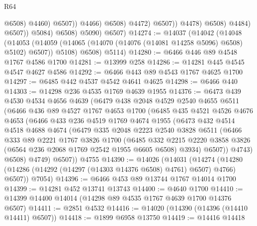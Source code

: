 \begin{lexlean}{R64}
\begin{coremodule}
                                        @6508)
                                      @4460)
                                    @6507))
                                @4466)
                              @6508)
                            @4472)
                          @6507))
                      @4478)
                    @6508)
                  @4484)
                @6507))
            @5084)
          @6508)
        @5090)
      @6507)
@14274 := @14037
    (@14042
      (@14048
        (@14053 (@14059 (@14065 (@14070 (@14076 (@14081 @14258 @5096) @6508) @5102) @6507)) @5108)
        @6508)
      @5114)
@14280 := @6466 @446 @89 @4548 @1767 @4586 @1700
@14281 := @13999 @258
@14286 := @14281 @445 @4545 @4547 @4627 @4586
@14292 := @6466 @443 @89 @4543 @1767 @4625 @1700
@14297 := @6485 @442 @4537 @4542 @4641 @4625
@14298 := @6466 @440
@14303 := @14298 @236 @4535 @1769 @4639 @1955
@14376 := @6473
    @439
    @4530
    @4534
    @4656
    @4639
    (@6479
      @438
      @2048
      @4529
      @2540
      @4655
      @6511
      (@6466
        @436
        @89
        @4527
        @1767
        @4653
        @1700
        (@6485
          @435
          @4521
          @4526
          @4676
          @4653
          (@6466
            @433
            @236
            @4519
            @1769
            @4674
            @1955
            (@6473
              @432
              @4514
              @4518
              @4688
              @4674
              (@6479
                @335
                @2048
                @2223
                @2540
                @3828
                @6511
                (@6466
                  @333
                  @89
                  @2221
                  @1767
                  @3826
                  @1700
                  (@6485
                    @332
                    @2215
                    @2220
                    @3858
                    @3826
                    (@6564 @236 @2068 @1769 @2542 @1955 @6605 @6508)
                    @3934)
                  @6507))
              @4743)
            @6508)
          @4749)
        @6507))
    @4755
@14390 := @14026
    (@14031
      (@14274 (@14280 (@14286 (@14292 (@14297 (@14303 @14376 @6508) @4761) @6507) @4766) @6507))
      @7054)
@14396 := @6466 @453 @89 @13744 @1767 @14014 @1700
@14399 := @14281 @452 @13741 @13743
@14400 := @4640 @1700
@14410 := @14399 @14400 @14014 (@14298 @89 @4535 @1767 @4639 @1700 @14376 @6507)
@14411 := @2851 @4532
@14416 := @14020 (@14390 (@14396 (@14410 @14411) @6507))
@14418 := @1899 @6958 @13750
@14419 := @14416 @14418

\end{coremodule}
\end{lexlean}

